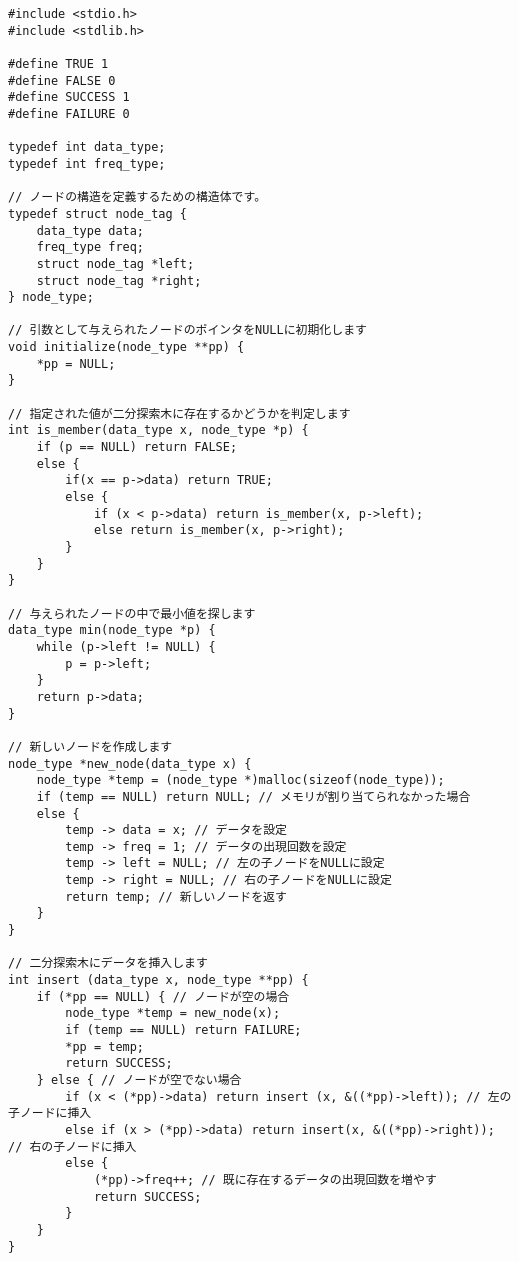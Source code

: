 \documentclass[]{jsarticle}
\begin{document}
\begin{lstlisting}[caption={binarySearchTree.c}]
#include <stdio.h>
#include <stdlib.h>

#define TRUE 1
#define FALSE 0
#define SUCCESS 1
#define FAILURE 0

typedef int data_type;
typedef int freq_type;

// ノードの構造を定義するための構造体です。
typedef struct node_tag {
    data_type data;
    freq_type freq;
    struct node_tag *left;
    struct node_tag *right;
} node_type;

// 引数として与えられたノードのポインタをNULLに初期化します
void initialize(node_type **pp) {
    *pp = NULL;
}

// 指定された値が二分探索木に存在するかどうかを判定します
int is_member(data_type x, node_type *p) {
    if (p == NULL) return FALSE;
    else {
        if(x == p->data) return TRUE;
        else {
            if (x < p->data) return is_member(x, p->left);
            else return is_member(x, p->right);
        }
    }
}

// 与えられたノードの中で最小値を探します
data_type min(node_type *p) {
    while (p->left != NULL) {
        p = p->left;
    }
    return p->data;
}

// 新しいノードを作成します
node_type *new_node(data_type x) {
    node_type *temp = (node_type *)malloc(sizeof(node_type));
    if (temp == NULL) return NULL; // メモリが割り当てられなかった場合
    else {
        temp -> data = x; // データを設定
        temp -> freq = 1; // データの出現回数を設定
        temp -> left = NULL; // 左の子ノードをNULLに設定
        temp -> right = NULL; // 右の子ノードをNULLに設定
        return temp; // 新しいノードを返す
    }
}

// 二分探索木にデータを挿入します
int insert (data_type x, node_type **pp) {
    if (*pp == NULL) { // ノードが空の場合
        node_type *temp = new_node(x);
        if (temp == NULL) return FAILURE;
        *pp = temp;
        return SUCCESS;
    } else { // ノードが空でない場合
        if (x < (*pp)->data) return insert (x, &((*pp)->left)); // 左の子ノードに挿入
        else if (x > (*pp)->data) return insert(x, &((*pp)->right)); // 右の子ノードに挿入
        else {
            (*pp)->freq++; // 既に存在するデータの出現回数を増やす
            return SUCCESS;
        }
    }
}


\end{lstlisting}
\end{document}
